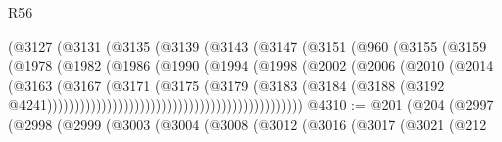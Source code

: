 \begin{lexlean}{R56}
\begin{coremodule}
{{{{{{{{{{{{{{{{{{{{{{{{{{{{{{{{{{{{{{{{{{{{{{{{{{{{{{{{{{{{{{{{{{{{{{{{{{{{{{{{{{{{{{{{{{{{{{{{{{{{{{{{{{{{{{{{{{{{{{{{{{{{{{{{{{{{{{{{{{{{{{{{{{{{{{{{{{{{{{{{{{{{{{{{{{{{{{{{{{{{{{{{{{{{{{{{{{{{{{{{{{{{{{{{{{{                                        (@3127
                                          (@3131
                                            (@3135
                                              (@3139
                                                (@3143
                                                  (@3147
                                                    (@3151
                                                      (@960
                                                        (@3155
                                                          (@3159
                                                            (@1978
                                                              (@1982
                                                                (@1986
                                                                  (@1990
                                                                    (@1994
                                                                      (@1998
                                                                        (@2002
                                                                          (@2006
                                                                            (@2010
                                                                              (@2014
                                                                                (@3163
                                                                                  (@3167
                                                                                    (@3171
                                                                                      (@3175
                                                                                        (@3179
                                                                                          (@3183
                                                                                            (@3184
                                                                                              (@3188
                                                                                                (@3192
                                                                                                  @4241)))))))))))))))))))))))))))))))))))))))))))))))
@4310 := @201
    (@204
      (@2997
        (@2998
          (@2999
            (@3003
              (@3004
                (@3008
                  (@3012
                    (@3016
                      (@3017
                        (@3021
                          (@212
}}}}}}}}}}}}}}}}}}}}}}}}}}}}}}}}}}}}}}}}}}}}}}}}}}}}}}}}}}}}}}}}}}}}}}}}}}}}}}}}}}}}}}}}}}}}}}}}}}}}}}}}}}}}}}}}}}}}}}}}}}}}}}}}}}}}}}}}}}}}}}}}}}}}}}}}}}}}}}}}}}}}}}}}}}}}}}}}}}}}}}}}}}}}}}}}}}}}}}}}}}}}}}}}}}}
\end{coremodule}
\end{lexlean}

